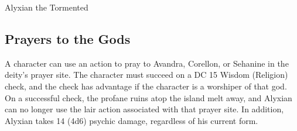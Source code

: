 \documentclass[10pt,a4paper,twoside,twocolumn,openany,nodeprecatedcode]{dndbook}
\begin{document}
\begin{DndMonster}[float=ht]{Alyxian the Tormented}
\begin{description}[nolistsep]
\end{description}

\subsection{Prayers to the Gods}
A character can use an action to pray to Avandra, Corellon, or Sehanine in the deity's prayer site. The character must succeed on a DC 15 Wisdom (Religion) check, and the check has advantage if the character is a worshiper of that god. On a successful check, the profane ruins atop the island melt away, and Alyxian can no longer use the lair action associated with that prayer site. In addition, Alyxian takes 14 (4d6) psychic damage, regardless of his current form.

\end{DndMonster}


\clearpage
{}
\end{document}
